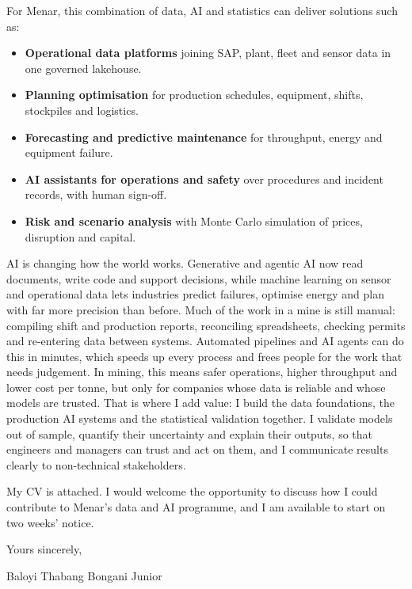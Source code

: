 \documentclass[a4paper,11pt]{article}
\begin{document}
For Menar, this combination of data, AI and statistics can deliver solutions such as:
\begin{itemize}[leftmargin=0.2in,itemsep=1pt,topsep=0pt]
    \item \textbf{Operational data platforms} joining SAP, plant, fleet and sensor data in one governed lakehouse.
    \item \textbf{Planning optimisation} for production schedules, equipment, shifts, stockpiles and logistics.
    \item \textbf{Forecasting and predictive maintenance} for throughput, energy and equipment failure.
    \item \textbf{AI assistants for operations and safety} over procedures and incident records, with human sign-off.
    \item \textbf{Risk and scenario analysis} with Monte Carlo simulation of prices, disruption and capital.
\end{itemize}

AI is changing how the world works. Generative and agentic AI now read documents, write code and
support decisions, while machine learning on sensor and operational data lets industries predict
failures, optimise energy and plan with far more precision than before. Much of the work in a mine is
still manual: compiling shift and production reports, reconciling spreadsheets, checking permits and
re-entering data between systems. Automated pipelines and AI agents can do this in minutes, which speeds
up every process and frees people for the work that needs judgement. In mining, this means safer
operations, higher throughput and lower cost per tonne, but only for companies whose data is reliable
and whose models are trusted. That is where I add value: I build the data foundations, the production
AI systems and the statistical validation together. I validate models out of sample, quantify their
uncertainty and explain their outputs, so that engineers and managers can trust and act on them, and
I communicate results clearly to non-technical stakeholders.

My CV is attached. I would welcome the opportunity to discuss how I could contribute to Menar's data and
AI programme, and I am available to start on two weeks' notice.

Yours sincerely,

\vspace{2pt}
Baloyi Thabang Bongani Junior
\end{document}
